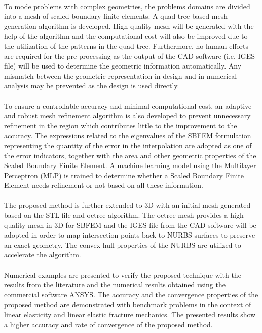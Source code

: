 \paragraph{}
To mode problems with complex geometries, the problems domains are divided into a mesh of scaled boundary finite elements.
A quad-tree based mesh generation algorithm is developed. High quality mesh will be generated with the help of the algorithm and the computational cost will also be improved due to the utilization of the patterns in the quad-tree.
Furthermore, no human efforts are required for the pre-processing as the output of the CAD software (i.e. IGES file) will be used to determine the geometric information automatically.
Any mismatch between the geometric representation in design and in numerical analysis may be prevented as the design is used directly.

\paragraph{}
To ensure a controllable accuracy and minimal computational cost, an adaptive and robust mesh refinement algorithm is also developed to prevent unnecessary refinement in the region which contributes little to the improvement to the accuracy.
The expressions related to the eigenvalues of the SBFEM formulation representing the quantity of the error in the interpolation are adopted as one of the error indicators, together with the area and other geometric properties of the Scaled Boundary Finite Element.
A machine learning model using the Multilayer Perceptron (MLP) is trained to determine whether a Scaled Boundary Finite Element needs refinement or not based on all these information.

\paragraph{}
The proposed method is further extended to 3D with an initial mesh generated based on the STL file and octree algorithm.
The octree mesh provides a high quality mesh in 3D for SBFEM and the IGES file from the CAD software will be adopted in order to map intersection points back to NURBS surfaces to preserve an exact geometry.
The convex hull properties of the NURBS are utilized to accelerate the algorithm.

\paragraph{}
Numerical examples are presented to verify the proposed technique with the results from the literature and the numerical results obtained using the commercial software ANSYS.
The accuracy and the convergence properties of the proposed method are demonstrated with benchmark problems in the context of linear elasticity and linear elastic fracture mechanics.
The presented results show a higher accuracy and rate of convergence of the proposed method.


